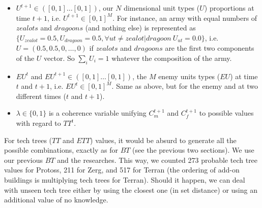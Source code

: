 \begin{itemize}
    \item $U^{t+1} \in ([0,1]\dots[0,1])$, our $N$ dimensional unit types ($U$) proportions at time $t+1$, i.e. $U^{t+1} \in [0,1]^M$. For instance, an army with equal numbers of $zealots$ and $dragoons$ (and nothing else) is represented as $\{U_{zealot}=0.5, U_{dragoon}=0.5, \forall ut \neq zealot|dragoon\ U_{ut}=0.0\}$, i.e. $U=(0.5,0.5,0,\dots,0)$ if $zealots$ and $dragoons$ are the first two components of the $U$ vector. So $\sum_i U_i = 1$ whatever the composition of the army.

    \item $EU^t$ and $EU^{t+1} \in ([0,1]\dots [0,1])$, the $M$ enemy units types ($EU$) at time $t$ and $t+1$, i.e. $EU^t \in [0,1]^M$. Same as above, but for the enemy and at two different times ($t$ and $t+1$).

    \item $\lambda \in \{0, 1\}$ is a coherence variable unifying $C_{m}^{t+1}$ and $C_{f}^{t+1}$ to possible values with regard to $TT^t$.

\end{itemize}

For tech trees ($TT$ and $ETT$) values, it would be absurd to generate all the possible combinations, exactly as for $BT$ (see the previous two sections). We use our previous $BT$ and the researches. %
This way, we counted 273 probable tech tree values for Protoss, 211 for Zerg, and 517 for Terran (the ordering of add-on buildings is multiplying tech trees for Terran). Should it happen, we can deal with unseen tech tree either by using the closest one (in set distance) or using an additional value of no knowledge. %

